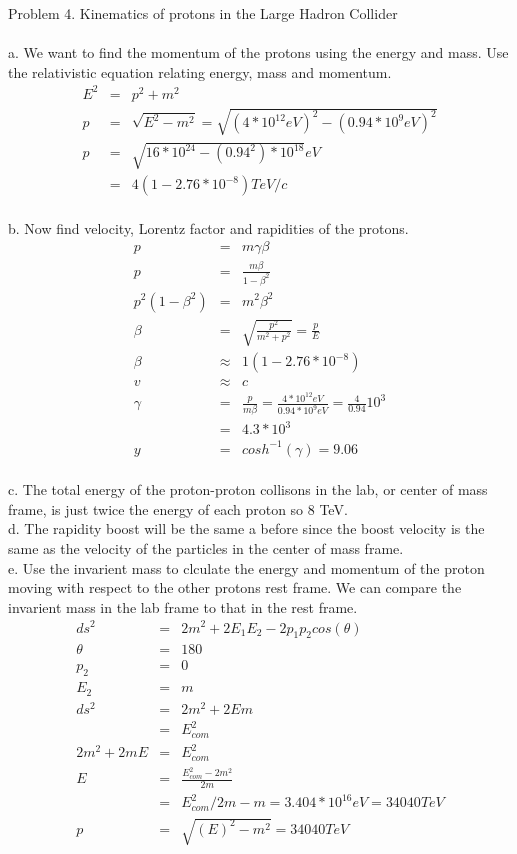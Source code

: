 \documentclass[11pt]{amsart}
\begin{document}
Problem 4. Kinematics of protons in the Large Hadron Collider \\ \\
a. We want to find the momentum of the protons using the energy and mass. Use the relativistic equation relating energy, mass and momentum. \\
\begin{eqnarray*}
E^{2} &=& p^{2}+m^{2} \\
p &=& \sqrt{E^{2}-m^{2}} = \sqrt{(4*10^{12}eV)^{2}-(0.94*10^{9}eV)^{2}} \\
p &=& \sqrt{16*10^{24}-(0.94^{2})*10^{18}}eV \\
&=&  4(1-2.76*10^{-8})TeV/c 
\end{eqnarray*} \\
b. Now find velocity, Lorentz factor and rapidities of the protons. \\
\begin{eqnarray*}
p &=& m\gamma\beta \\
p &=& \frac{m\beta}{1-\beta^{2}} \\
p^{2}(1-\beta^{2}) &=& m^{2}\beta^{2} \\
\beta &=& \sqrt{\frac{p^{2}}{m^{2}+p^{2}}}= \frac{p}{E} \\
\beta &\approx& 1(1-2.76*10^{-8}) \\
v &\approx& c \\
\gamma &=& \frac{p}{m\beta} = \frac{4*10^{12}eV}{0.94*10^{9}eV} = \frac{4}{0.94}10^{3} \\
&=& 4.3*10^{3}  \\
y &=& cosh^{-1}(\gamma) = 9.06
\end{eqnarray*} \\
c. The total energy of the proton-proton collisons in the lab, or center of mass frame, is just twice the energy of each proton so 8 TeV. \\
d. The rapidity boost will be the same a before since the boost velocity is the same as the velocity of the particles in the center of mass frame. \\
e. Use the invarient mass to clculate the energy and momentum of the proton moving with respect to the other protons rest frame. We can compare the invarient mass in the lab frame to that in the rest frame. \\
\begin{eqnarray*}
ds^{2} &=& 2m^{2}+2E_{1}E_{2}-2p_{1}p_{2}cos(\theta) \\
\theta &=& 180 \\
p_{2} &=& 0 \\
E_{2} &=& m \\
ds^{2} &=& 2m^{2}+2Em \\
&=& E_{com}^{2} \\
2m^{2}+2mE &=& E_{com}^{2} \\
E &=& \frac{E_{com}^{2}-2m^{2}}{2m} \\
&=& E_{com}^{2}/2m-m = 3.404*10^{16} eV = 34040 TeV  \\
p &=& \sqrt{(E)^{2}-m^{2}} = 34040 TeV
\end{eqnarray*} \\
\end{document}
